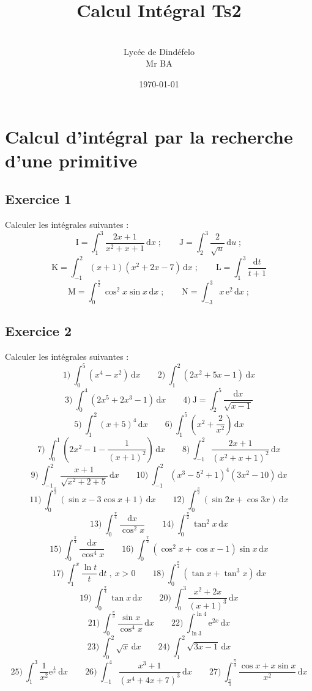 \documentclass[12pt]{article}
\author{\\Lycée de Dindéfelo\\Mr BA}
\title{\textbf{Calcul Intégral Ts2}}
\date{\today}
\begin{document}
\maketitle
\newpage

\section*{Calcul d'intégral par la recherche d'une primitive}

\subsection*{Exercice 1}
Calculer les intégrales suivantes :
\[
\text{I} = \int_{1}^{3}\frac{2x+1}{x^{2}+x+1}\,\mathrm{d}x\;;\qquad \text{J} = \int_{2}^{3}\frac{2}{\sqrt{u}}\,\mathrm{d}u\;;
\]
\[
\text{K} = \int_{-1}^{2}(x+1)(x^{2}+2x-7)\,\mathrm{d}x\;;\qquad \text{L} = \int_{1}^{3}\frac{\mathrm{d}t}{t+1}
\]
\[
\text{M} = \int_{0}^{\frac{\pi}{2}}\cos^{2}x\sin x\,\mathrm{d}x\;;\qquad \text{N} = \int_{-3}^{3}x\,\mathrm{e}^{2}\,\mathrm{d}x\;;
\]

\subsection*{Exercice 2}
Calculer les intégrales suivantes :
\[
1)\ \int_{0}^{5}(x^{4}-x^{2})\,\mathrm{d}x\qquad 2)\ \int_{1}^{2}(2x^{2}+5x-1)\,\mathrm{d}x
\]
\[
3)\ \int_{0}^{4}(2x^{5}+2x^{3}-1)\,\mathrm{d}x\qquad 4)\ \text{J} = \int_{2}^{5}\frac{\mathrm{d}x}{\sqrt{x-1}}
\]
\[
5)\ \int_{1}^{2}(x+5)^{4}\,\mathrm{d}x\qquad 6)\ \int_{1}^{5}\left(x^{2}+\frac{2}{x^{2}}\right)\,\mathrm{d}x
\]
\[
7)\ \int_{0}^{1}\left(2x^{2}-1-\frac{1}{(x+1)^{2}}\right)\,\mathrm{d}x\qquad 8)\ \int_{-1}^{2}\frac{2x+1}{(x^{2}+x+1)^{2}}\,\mathrm{d}x
\]
\[
9)\ \int_{-1}^{2}\frac{x+1}{\sqrt{x^{2}+2+5}}\,\mathrm{d}x\qquad 10)\ \int_{-1}^{2}(x^{3}-5^{2}+1)^{4}(3x^{2}-10)\,\mathrm{d}x
\]
\[
11)\ \int_{0}^{\frac{\pi}{2}}(\sin x-3\cos x+1)\,\mathrm{d}x\qquad 12)\ \int_{0}^{\frac{\pi}{2}}(\sin 2x+\cos 3x)\,\mathrm{d}x
\]
\[
13)\ \int_{0}^{\frac{\pi}{4}}\frac{\mathrm{d}x}{\cos^{2}x}\qquad 14)\ \int_{0}^{\frac{\pi}{2}}\tan^{2}x\,\mathrm{d}x
\]
\[
15)\ \int_{0}^{\frac{\pi}{4}}\frac{\mathrm{d}x}{\cos^{4}x}\qquad 16)\ \int_{0}^{\frac{\pi}{2}}(\cos^{2}x+\cos x-1)\sin x\,\mathrm{d}x
\]
\[
17)\ \int_{1}^{x}\frac{\ln t}{t}\,\mathrm{d}t\;,\ x > 0\qquad 18)\ \int_{0}^{\frac{\pi}{4}}(\tan x+\tan^{3}x)\,\mathrm{d}x
\]
\[
19)\ \int_{0}^{\frac{\pi}{4}}\tan x\,\mathrm{d}x\qquad 20)\ \int_{0}^{3}\frac{x^{2}+2x}{(x+1)^{3}}\,\mathrm{d}x
\]
\[
21)\ \int_{0}^{\frac{\pi}{3}}\frac{\sin x}{\cos^{4}x}\,\mathrm{d}x\qquad 22)\ \int_{\ln 3}^{\ln 4}\mathrm{e}^{2x}\,\mathrm{d}x
\]
\[
23)\ \int_{0}^{2}\sqrt{x}\,\mathrm{d}x\qquad 24)\ \int_{1}^{2}\sqrt{3x-1}\,\mathrm{d}x
\]
\[
25)\ \int_{1}^{3}\frac{1}{x^{2}}\mathrm{e}^{\frac{1}{x}}\,\mathrm{d}x\qquad 26)\ \int_{-1}^{4}\frac{x^{3}+1}{(x^{4}+4x+7)^{3}}\,\mathrm{d}x\qquad 27)\ \int_{\frac{\pi}{3}}^{\frac{\pi}{4}}\frac{\cos x+x\sin x}{x^{2}}\,\mathrm{d}x
\]
\end{document}
